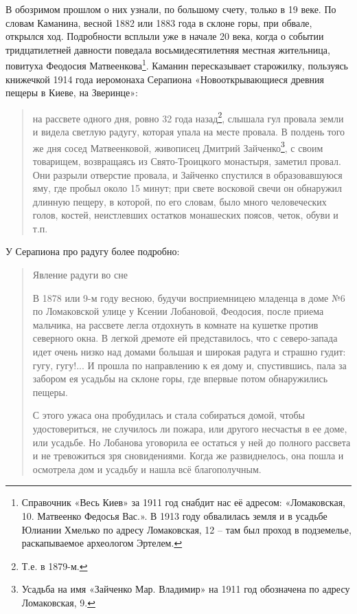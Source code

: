 В обозримом прошлом о них узнали, по большому счету, только в 19 веке. По словам Каманина, весной 1882 или 1883 года в склоне горы, при обвале, открылся ход. Подробности всплыли уже в начале 20 века, когда о событии тридцатилетней давности поведала восьмидесятилетняя местная жительница, повитуха Феодосия Матвеенкова\footnote{Справочник «Весь Киев» за 1911 год снабдит нас её адресом: «Ломаковская, 10. Матвеенко Федосья Вас.». В 1913 году обвалилась земля и в усадьбе Юлиании Хмелько по адресу Ломаковская, 12 – там был проход в подземелье, раскапываемое археологом Эртелем.}. Каманин пересказывает старожилку, пользуясь книжечкой 1914 года иеромонаха Серапиона «Новооткрывающиеся древния пещеры в Киеве, на Зверинце»:

\begin{quotation}
на рассвете одного дня, ровно 32 года назад\footnote{Т.е. в 1879-м.}, слышала гул провала земли и видела светлую радугу, которая упала на месте провала. В полдень того же дня сосед Матвеенковой, живописец Дмитрий Зайченко\footnote{Усадьба на имя «Зайченко Мар. Владимир» на 1911 год обозначена по адресу Ломаковская, 9.}, с своим товарищем, возвращаясь из Свято-Троицкого монастыря, заметил провал. Они разрыли отверстие провала, и Зайченко спустился в образовавшуюся яму, где пробыл около 15 минут; при свете восковой свечи он обнаружил длинную пещеру, в которой, по его словам, было много человеческих голов, костей, неистлевших остатков монашеских поясов, четок, обуви и т.п.
\end{quotation}

У Серапиона про радугу более подробно:

\begin{quotation}
Явление радуги во сне

В 1878 или 9-м году весною, будучи восприемницею младенца в доме №6 по Ломаковской улице у Ксении Лобановой, Феодосия, после приема мальчика, на рассвете легла отдохнуть в комнате на кушетке против северного окна. В легкой дремоте ей представилось, что с северо-запада идет очень низко над домами большая и широкая радуга и страшно гудит: гугу, гугу!... И прошла по направлению к ея дому и, спустившись, пала за забором ея усадьбы на склоне горы, где впервые потом обнаружились пещеры.

С этого ужаса она пробудилась и стала собираться домой, чтобы удостовериться, не случилось ли пожара, или другого несчастья в ее доме, или усадьбе. Но Лобанова уговорила ее остаться у ней до полного рассвета и не тревожиться зря сновидениями. Когда же развиднелось, она пошла и осмотрела дом и усадьбу и нашла всё благополучным.
\end{quotation}

